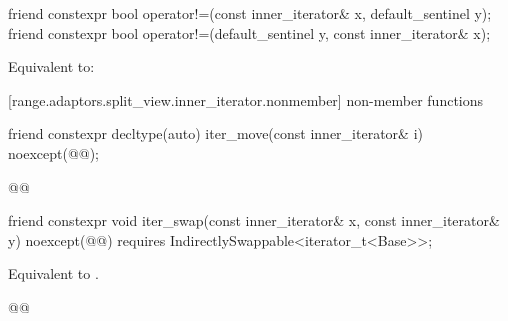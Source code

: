 {{%
\begin{itemdecl}
friend constexpr bool operator!=(const inner_iterator& x, default_sentinel y);
friend constexpr bool operator!=(default_sentinel y, const inner_iterator& x);
\end{itemdecl}

\begin{itemdescr}
\pnum
\effects Equivalent to: 
\end{itemdescr}
} %

[range.adaptors.split_view.inner_iterator.nonmember]{ non-member functions}

%
\begin{itemdecl}
friend constexpr decltype(auto) iter_move(const inner_iterator& i)
  noexcept(@\oldtxt{\seebelow}@);
\end{itemdecl}

\begin{itemdescr}
\pnum
\newtxt{\effects }

\oldtxt{\returns }

\pnum
{}
\begin{codeblock}
@@
\end{codeblock}
\end{itemdescr}

%
\begin{itemdecl}
friend constexpr void iter_swap(const inner_iterator& x, const inner_iterator& y)
  noexcept(@\oldtxt{\seebelow}@)
  requires IndirectlySwappable<iterator_t<Base>>;
\end{itemdecl}

\begin{itemdescr}
\pnum
\effects Equivalent to .

\pnum
{}
\begin{codeblock}
@@
\end{codeblock}
\end{itemdescr}

}
